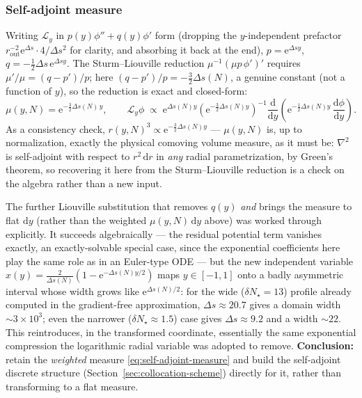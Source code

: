 \documentclass[a4paper,11pt]{article}
\newcommand{\semibold}[1]{{\fontseries{b}\selectfont{#1}}}
\renewcommand{\d}{\mathrm{d}}
\newcommand{\e}[1]{\mathrm{e}^{{#1}}}
\newenvironment{panel}{\begin{tcolorbox}[enhanced,breakable,colback=gray!10,colframe=gray!30]\small}{\end{tcolorbox}}
\newcommand{\Ny}{N}                          %
\newcommand{\dNstar}{\delta N_\star}         %
\newcommand{\field}{\phi}                    %
\newcommand{\rad}{r}                         %
\newcommand{\yco}{y}                         %
\newcommand{\rout}{\rad_{\mathrm{out}}}      %
\newcommand{\Deltas}{\Delta s}                %
\newcommand{\measure}{\mu}                   %
\newcommand{\Lop}{\mathcal{L}_\yco}          %
\begin{document}
\subsubsection{Self-adjoint measure}

Writing $\Lop$ in $p(\yco)\field''+q(\yco)\field'$ form (dropping the
$\yco$-independent prefactor $\rout^{-2}\e{\Deltas}\cdot4/\Deltas^2$ for
clarity, and absorbing it back at the end), $p=\e{\Deltas\yco}$,
$q=-\tfrac12\Deltas\,\e{\Deltas\yco}$. The Sturm--Liouville reduction
$\measure^{-1}(\measure p\,\field')'$ requires $\measure'/\measure=(q-p')/p$;
here $(q-p')/p = -\tfrac32\Deltas(\Ny)$, a genuine constant (not a function
of $\yco$), so the reduction is exact and closed-form:
\begin{equation}
    \measure(\yco,\Ny) = \e{-\frac32\Deltas(\Ny)\,\yco} ,
    \qquad
    \Lop\field
    \;\propto\;
    \e{\Deltas(\Ny)\yco}\left(\e{-\frac32\Deltas(\Ny)\yco}\right)^{-1}\frac{\d}{\d\yco}\!\left(\e{-\frac12\Deltas(\Ny)\yco}\,\frac{\d\field}{\d\yco}\right) .
    \label{eq:self-adjoint-measure}
\end{equation}
As a consistency check, $\rad(\yco,\Ny)^3 \propto \e{-\frac32\Deltas(\Ny)\yco}$
--- $\measure(\yco,\Ny)$ is, up to normalization, exactly the physical
comoving volume measure, as it must be: $\nabla^2$ is self-adjoint with
respect to $\rad^2\,\d\rad$ in \emph{any} radial parametrization, by
Green's theorem, so recovering it here from the Sturm--Liouville reduction
is a check on the algebra rather than a new input.

\begin{panel}
\semibold{Flat-measure (Schrödinger normal) form: explored and set aside.}
The further Liouville substitution that removes $q(\yco)$ \emph{and}
brings the measure to flat $\d\yco$ (rather than the weighted
$\measure(\yco,\Ny)\,\d\yco$ above) was worked through explicitly. It
succeeds algebraically --- the residual potential term vanishes exactly,
an exactly-solvable special case, since the exponential coefficients here
play the same role as in an Euler-type ODE --- but the new independent
variable $x(\yco)=\tfrac{2}{\Deltas(\Ny)}(1-\e{-\Deltas(\Ny)\yco/2})$ maps
$\yco\in[-1,1]$ onto a badly asymmetric interval whose width grows like
$\e{\Deltas(\Ny)/2}$: for the wide ($\dNstar=13$) profile already computed
in the gradient-free approximation, $\Deltas\approx20.7$ gives a domain
width $\sim3\times10^3$; even the narrower ($\dNstar\approx1.5$) case gives
$\Deltas\approx9.2$ and a width $\sim22$. This reintroduces, in the
transformed coordinate, essentially the same exponential compression the
logarithmic radial variable was adopted to remove. \textbf{Conclusion:}
retain the \emph{weighted} measure \eqref{eq:self-adjoint-measure} and
build the self-adjoint discrete structure (Section~\ref{sec:collocation-scheme})
directly for it, rather than transforming to a flat measure.
\end{panel}
\end{document}

